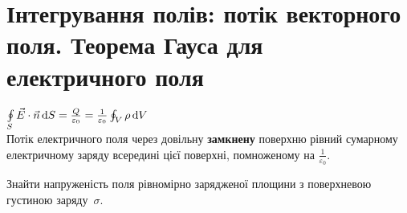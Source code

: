 \setcounter{section}{5}

\section{Інтегрування полів: потік векторного поля. Теорема Гауса для електричного поля}

\hrulefill
\begin{theorem}
$\oint\limits_S \Vec{E} \cdot \Vec{n} \d S = \frac{Q}{\varepsilon_{0}} = \frac{1}{\varepsilon_{0}} \oint_V \rho \d V$ \\
Потік електричного поля через довільну \textbf{замкнену} поверхню рівний сумарному електричному заряду всередині цієї поверхні, помноженому на $\frac{1}{\varepsilon_{0}}$.
\end{theorem}
\hrulefill

\begin{problem}
Знайти напруженість поля рівномірно зарядженої площини з поверхневою густиною заряду~$\sigma$.
\end{problem}
	
\renewcommand{\given}{}
\renewcommand{\question}{}
\renewcommand{\innertext}{}
\renewcommand{\imageone}{image}

\genpreambula


	
	